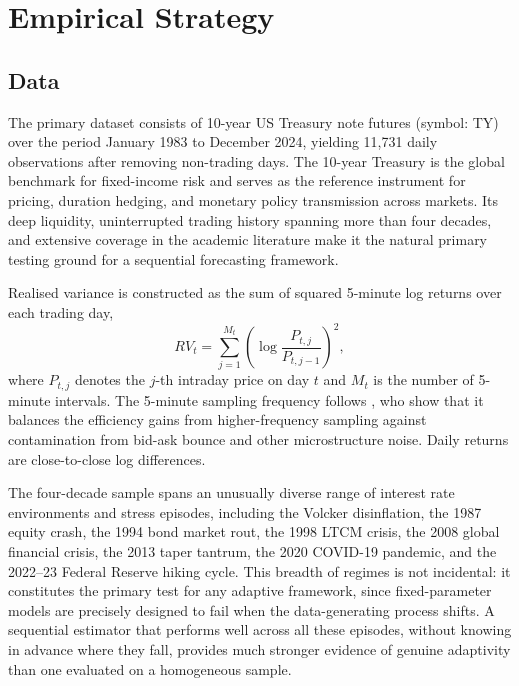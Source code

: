 \section{Empirical Strategy}\label{sec:empirical}

\subsection{Data}\label{sec:data}

The primary dataset consists of 10-year US Treasury note futures (symbol: TY) over the period January 1983 to December 2024, yielding 11,731 daily observations after removing non-trading days. The 10-year Treasury is the global benchmark for fixed-income risk and serves as the reference instrument for pricing, duration hedging, and monetary policy transmission across markets. Its deep liquidity, uninterrupted trading history spanning more than four decades, and extensive coverage in the academic literature make it the natural primary testing ground for a sequential forecasting framework.

Realised variance is constructed as the sum of squared 5-minute log returns over each trading day,
\begin{equation}\label{eq:rv_def}
    RV_t = \sum_{j=1}^{M_t} \left(\log \frac{P_{t,j}}{P_{t,j-1}}\right)^2,
\end{equation}
where $P_{t,j}$ denotes the $j$-th intraday price on day $t$ and $M_t$ is the number of 5-minute intervals. The 5-minute sampling frequency follows \citet{liu2015does}, who show that it balances the efficiency gains from higher-frequency sampling against contamination from bid-ask bounce and other microstructure noise. Daily returns are close-to-close log differences.

The four-decade sample spans an unusually diverse range of interest rate environments and stress episodes, including the Volcker disinflation, the 1987 equity crash, the 1994 bond market rout, the 1998 LTCM crisis, the 2008 global financial crisis, the 2013 taper tantrum, the 2020 COVID-19 pandemic, and the 2022--23 Federal Reserve hiking cycle. This breadth of regimes is not incidental: it constitutes the primary test for any adaptive framework, since fixed-parameter models are precisely designed to fail when the data-generating process shifts. A sequential estimator that performs well across all these episodes, without knowing in advance where they fall, provides much stronger evidence of genuine adaptivity than one evaluated on a homogeneous sample.

